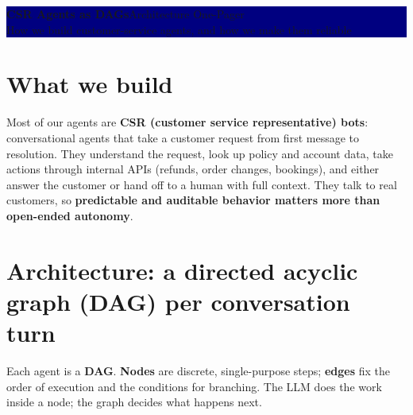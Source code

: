 \documentclass[10pt]{article}
\begin{document}
\noindent\colorbox{navy}{\parbox{\dimexpr\linewidth-2\fboxsep}{\vspace{5pt}
  {\color{white}\bfseries\LARGE CSR Agents as DAGs}\hfill{\color{white!80!navy}\small Architecture One-Pager}\\[2pt]
  {\color{white!85!navy}\normalsize How we build customer-service agents, and how we make them reliable}\vspace{5pt}}}

\section{What we build}
Most of our agents are \textbf{CSR (customer service representative) bots}: conversational agents that take a
customer request from first message to resolution. They understand the request, look up policy and account
data, take actions through internal APIs (refunds, order changes, bookings), and either answer the customer
or hand off to a human with full context. They talk to real customers, so \textbf{predictable and auditable
behavior matters more than open-ended autonomy}.

\section{Architecture: a directed acyclic graph (DAG) per conversation turn}
Each agent is a \textbf{DAG}. \textbf{Nodes} are discrete, single-purpose steps; \textbf{edges} fix the order of
execution and the conditions for branching. The LLM does the work inside a node; the graph decides what happens next.
\end{document}
